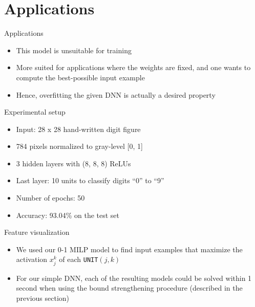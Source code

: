 \documentclass{beamer}
\newcommand{\UNIT}{\texttt{UNIT}$(j,k)$}
\begin{document}
\section{Applications}
\begin{frame}{Applications}
  \begin{itemize}
  \item This model is unsuitable for training
  \item More suited for applications where the weights are fixed, and one wants to compute the best-possible input example
  \item Hence, overfitting the given DNN is actually a desired property
  \end{itemize}
\end{frame}

\begin{frame}{Experimental setup}
  \begin{itemize}
  \item Input: 28 x 28 hand-written digit figure
  \item 784 pixels normalized to gray-level [0, 1]
  \item 3 hidden layers with (8, 8, 8) ReLUs
  \item Last layer: 10 units to classify digits ``0'' to ``9''
  \item Number of epochs: 50
  \item Accuracy: 93.04\% on the test set
  \end{itemize}
\end{frame}

\begin{frame}{Feature visualization}
  \begin{itemize}
  \item We used our 0-1 MILP model to find input examples that maximize the activation $x_j^{k}$ of each \UNIT
  \item For our simple DNN, each of the resulting models could be solved within 1 second when using the bound strengthening procedure (described in the previous section)
  \end{itemize}
\end{frame}
\end{document}

